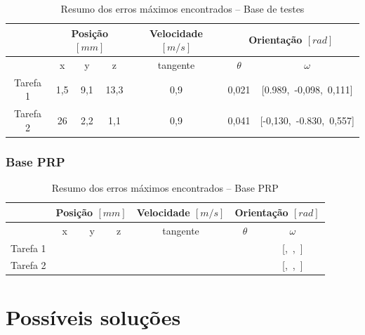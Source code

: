 \begin{table}[h!]
\centering
\caption{Resumo dos erros máximos encontrados -- Base de testes}
\label{tab::erros_base_testes}
\begin{tabular}{@{}ccccccc@{}}
\toprule
         & \multicolumn{3}{c}{\textbf{Posição $[mm]$}} & \textbf{Velocidade $[m/s]$} & \multicolumn{2}{c}{\textbf{Orientação $[rad]$}} 	\\ \midrule
         & x          & y          & z          & tangente            & $\theta$            & $\omega$         		\\
Tarefa 1 & 1,5    	  & 9,1        & 13,3       & 0,9                 &	0,021				& [0.989,~-0,098,~0,111]                  	\\
Tarefa 2 & 26     	  & 2,2 	   & 1,1        & 0,9                 & 0,041				& [-0,130,~-0.830,~0,557] \\ \bottomrule
\end{tabular}
\end{table}


\subsubsection{Base PRP}

\begin{table}[h!]
\centering
\caption{Resumo dos erros máximos encontrados -- Base PRP}
\label{tab::erros_base_prp}
\begin{tabular}{@{}ccccccc@{}}
\toprule
         & \multicolumn{3}{c}{\textbf{Posição $[mm]$}} & \textbf{Velocidade $[m/s]$} & \multicolumn{2}{c}{\textbf{Orientação $[rad]$}} 	\\ \midrule
         & x          & y			& z			& tangente		& $\theta$		& $\omega$		\\
Tarefa 1 &     	 	  &				&			&				&				& [,~,~]		\\
Tarefa 2 &      	  &				&			&				&				& [,~,~]		\\ \bottomrule
\end{tabular}
\end{table}


\section{Possíveis soluções} \label{sec::solucoes}

